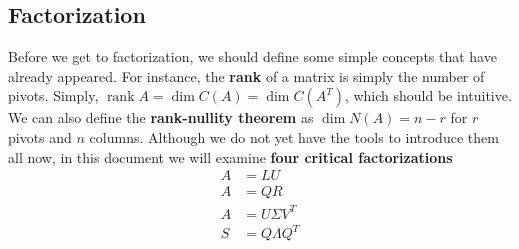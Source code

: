 \documentclass[11pt]{article}
\begin{document}
\subsection{Factorization}
\item Before we get to factorization, we should define some simple concepts that have already appeared. For instance, the \textbf{rank} of a matrix is simply the number of pivots. Simply, $\operatorname{rank} A = \dim C(A) = \dim C(A^{T})$, which should be intuitive. We can also define the \textbf{rank-nullity theorem} as $\dim N(A) = n-r$ for $r$ pivots and $n$ columns. Although we do not yet have the tools to introduce them all now, in this document we will examine \textbf{four critical factorizations}
	\begin{align}
		A &= LU \\
		A &= QR \\
		A &= U \Sigma V^{T} \\
		S &= Q \Lambda Q^{T} 
	\end{align}
\end{document}
